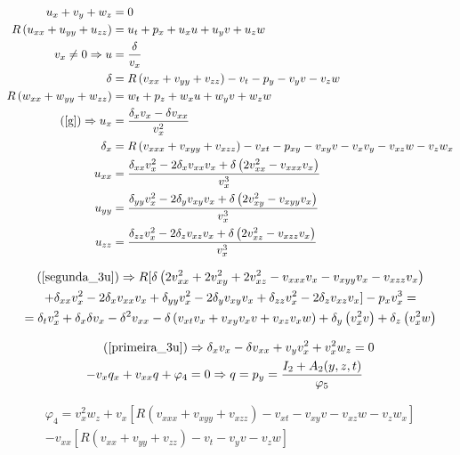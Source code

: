 \documentclass[12pt,a4paper]{article}
\begin{document}
	\begin{align}
	  u_x + v_y + w_z &= 0 \label{primeira_3u} \\
	  R \left(u_{xx} + u_{yy} + u_{zz} \right) &= u_t + p_x + u_x u + u_y v + u_z w \label{segunda_3u} \\
	  v_x \neq 0 \Rightarrow u &= \frac{\delta}{v_x} \\
	  \delta &= R \left(v_{xx} + v_{yy} + v_{zz} \right) - v_t - p_y - v_y v - v_z w \label{delta_3u} \\
	  R \left(w_{xx} + w_{yy} + w_{zz} \right) &= w_t + p_z + w_x u + w_y v + w_z w \label{quarta_3u} \\
	  (\ref{g}) \Rightarrow u_x &= \frac{\delta_x v_x - \delta v_{xx}}{v_x^2} \\
	  \delta_x &= R \left(v_{xxx} + v_{xyy} + v_{xzz} \right) - v_{xt} - p_{xy} - v_{xy} v - v_x v_y - v_{xz} w - v_z w_x \\
	  u_{xx} &= \frac{\delta_{xx} v_x^2 - 2\delta_x v_{xx} v_x + \delta \left( 2v_{xx}^2 - v_{xxx} v_x \right)}{v_x^3} \\
	  u_{yy} &= \frac{\delta_{yy} v_x^2 - 2\delta_y v_{xy} v_x + \delta \left( 2v_{xy}^2 - v_{xyy} v_x \right)}{v_x^3} \\
	  u_{zz} &= \frac{\delta_{zz} v_x^2 - 2\delta_z v_{xz} v_x + \delta \left( 2v_{xz}^2 - v_{xzz} v_x \right)}{v_x^3}
	\end{align}

	\begin{multline}
    (\ref{segunda_3u}) \Rightarrow R [\delta \left( 2 v_{xx}^2 + 2 v_{xy}^2 + 2 v_{xz}^2 - v_{xxx}v_x - v_{xyy} v_x - v_{xzz} v_x \right) \\
    + \delta_{xx} v_x^2 - 2\delta_x v_{xx} v_x + \delta_{yy} v_x^2 - 2\delta_y v_{xy} v_x + \delta_{zz} v_x^2 - 2\delta_z v_{xz} v_x ] - p_x v_x^3 = \\
    = \delta_t v_x^2 + \delta_x \delta v_x - \delta^2 v_{xx} - \delta \left(v_{xt} v_x + v_{xy} v_x v + v_{xz} v_x w \right) + \delta_y \left(v_x^2 v \right) + \delta_z \left(v_x^2 w \right) \label{complicada_3u}
	\end{multline}

	\begin{align}
    (\ref{primeira_3u}) &\Rightarrow \delta_x v_x - \delta v_{xx} + v_y v_x^2 + v_x^2 w_z = 0 \\
    -v_x q_x + v_{xx} q + \varphi_4 &= 0 \Rightarrow q = p_y = \frac{I_2 + A_2(y,z,t)}{\varphi_5}
	\end{align}

	\begin{multline}
    \varphi_4 = v_x^2 w_z + v_x \left[ R \left(v_{xxx} + v_{xyy} + v_{xzz} \right) - v_{xt} - v_{xy} v - v_{xz} w - v_z w_x \right] \\
    - v_{xx} \left[ R \left(v_{xx} + v_{yy} + v_{zz} \right) - v_t - v_y v - v_z w \right] \label{fi4_3u}
	\end{multline}
\end{document}
